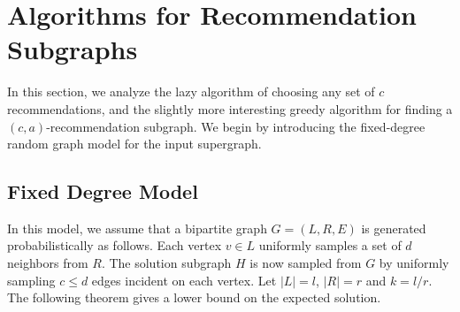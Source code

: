 \section{Algorithms for Recommendation Subgraphs}
In this section, we analyze the lazy algorithm of choosing any set of
$c$ recommendations, and the slightly more interesting greedy algorithm
for finding a $(c,a)$-recommendation subgraph. We begin by introducing
the fixed-degree random graph model for the input supergraph.


\subsection{Fixed Degree Model}
\label{fixed-degree}

In this model, we assume that a bipartite graph $G=(L,R,E)$ is
generated probabilistically as follows. Each vertex $v\in L$
uniformly samples a set of $d$ neighbors from $R$. The solution subgraph $H$
is now sampled from $G$ by uniformly sampling $c\leq d$ edges incident
on each vertex. Let $|L|=l$, $|R|=r$ and $k=l/r$.
The following theorem gives a lower bound on the expected solution.






